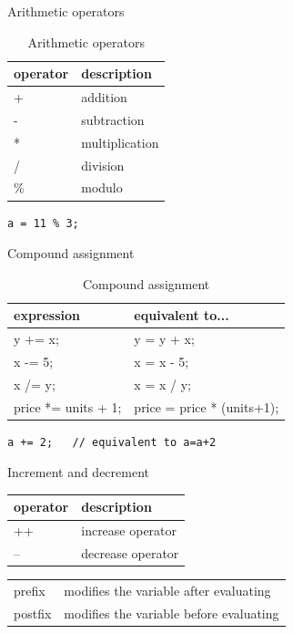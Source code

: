 \documentclass{beamer}
\begin{document}
\begin{frame}[fragile]{Arithmetic operators}
\begin{table}
\begin{tabular}{l | l}
operator & description \\
\hline
+ & addition \\
- & subtraction \\
* & multiplication \\
/ & division \\
\% & modulo
\end{tabular}
\caption{Arithmetic operators}
\end{table}
\begin{lstlisting}[caption=Modulo operator]
a = 11 % 3;
\end{lstlisting}
\end{frame}

\begin{frame}[fragile]{Compound assignment}
\begin{table}
\begin{tabular}{l | l}
expression & equivalent to... \\
\hline
y += x; & y = y + x; \\
x -= 5; & x = x - 5; \\
x /= y; & x = x / y; \\
price *= units + 1; & price = price * (units+1);
\end{tabular}
\caption{Compound assignment}
\end{table}
\begin{lstlisting}[caption=Modulo operator]
a += 2;   // equivalent to a=a+2
\end{lstlisting}
\end{frame}

\begin{frame}{Increment and decrement}
\begin{table}
\begin{tabular}{l | l}
operator & description \\
\hline
++ & increase operator \\
-- & decrease operator
\end{tabular}
\end{table}

\begin{table}
\begin{tabular}{l | l}
prefix & modifies the variable after evaluating \\
postfix & modifies the variable before evaluating
\end{tabular}
\end{table}
\end{frame}
\end{document}
